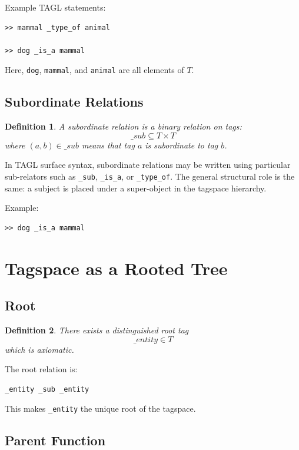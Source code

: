 \documentclass{article}
\newtheorem{definition}{Definition}[section]
\begin{document}
Example TAGL statements:

\begin{verbatim}
>> mammal _type_of animal

>> dog _is_a mammal
\end{verbatim}

Here, \texttt{dog}, \texttt{mammal}, and \texttt{animal} are all elements of
$T$.

\subsection{Subordinate Relations}

\begin{definition}
A subordinate relation is a binary relation on tags:
\[
\mathrel{\_sub} \subseteq T \times T
\]
where $(a,b) \in \mathrel{\_sub}$ means that tag $a$ is subordinate to tag $b$.
\end{definition}

In TAGL surface syntax, subordinate relations may be written using
particular sub-relators such as \texttt{\_sub}, \texttt{\_is\_a}, or
\texttt{\_type\_of}. The general structural role is the same: a subject is
placed under a super-object in the tagspace hierarchy.

Example:

\begin{verbatim}
>> dog _is_a mammal
\end{verbatim}

\section{Tagspace as a Rooted Tree}

\subsection{Root}

\begin{definition}
There exists a distinguished root tag
\[
\_entity \in T
\]
which is axiomatic.
\end{definition}

The root relation is:

\begin{verbatim}
_entity _sub _entity
\end{verbatim}

This makes \texttt{\_entity} the unique root of the tagspace.

\subsection{Parent Function}
\end{document}
